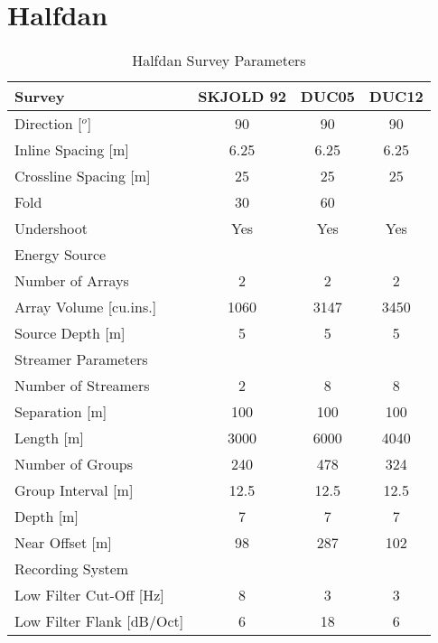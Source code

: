 \section*{Halfdan}
\begin{table}
\centering
\caption{Halfdan Survey Parameters}
\label{halfdan-label}
\begin{tabular}{|l|ccc|}
\hline
\rowcolor[HTML]{C0C0C0}Survey & \cellcolor[HTML]{C0C0C0}SKJOLD 92 & \cellcolor[HTML]{C0C0C0}DUC05 & \cellcolor[HTML]{C0C0C0}DUC12  \\ \hline
Direction [$^o$] & 90 & 90 & 90  \\ \hline
Inline Spacing [m] & 6.25 & 6.25 & 6.25  \\ \hline
Crossline Spacing [m] & 25 & 25 & 25  \\ \hline
Fold & 30 & 60 &   \\ \hline
Undershoot & Yes & Yes & Yes  \\ \hline
\rowcolor[HTML]{C0C0C0}Energy Source & \multicolumn{3}{l|}{\cellcolor[HTML]{C0C0C0}} \\ \hline
Number of Arrays & 2 & 2 & 2  \\ \hline
Array Volume [cu.ins.] & 1060 & 3147 & 3450  \\ \hline
Source Depth [m] & 5 & 5 & 5  \\ \hline
\rowcolor[HTML]{C0C0C0}Streamer Parameters & \multicolumn{3}{l|}{\cellcolor[HTML]{C0C0C0}} \\ \hline
Number of Streamers & 2 & 8 & 8  \\ \hline
Separation [m] & 100 & 100 & 100  \\ \hline
Length [m] & 3000 & 6000 & 4040  \\ \hline
Number of Groups & 240 & 478 & 324  \\ \hline
Group Interval [m] & 12.5 & 12.5 & 12.5  \\ \hline
Depth [m] & 7 & 7 & 7  \\ \hline
Near Offset [m] & 98 & 287 & 102  \\ \hline
\rowcolor[HTML]{C0C0C0}Recording System & \multicolumn{3}{l|}{\cellcolor[HTML]{C0C0C0}} \\ \hline
Low Filter Cut-Off [Hz] & 8 & 3 & 3  \\ \hline
Low Filter Flank [dB/Oct] & 6 & 18 & 6  \\ \hline
\end{tabular}
\end{table}


